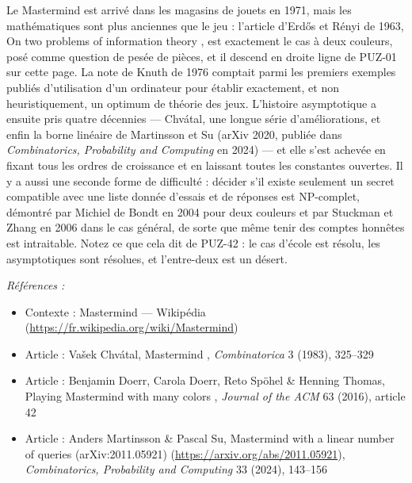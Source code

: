 \documentclass[11pt]{article}
\newenvironment{refs}{\par\small\noindent\emph{Références :}\begin{itemize}\setlength\itemsep{0pt}}{\end{itemize}\normalsize}
\begin{document}
\noindent Le Mastermind est arrivé dans les magasins de jouets en 1971, mais les
mathématiques sont plus anciennes que le jeu : l'article d'Erd\H{o}s et Rényi de 1963, \og{} On two
problems of information theory \fg{}, est exactement le cas à deux couleurs, posé comme question
de pesée de pièces, et il descend en droite ligne de PUZ-01 sur cette page. La note de Knuth
de 1976 comptait parmi les premiers exemples publiés d'utilisation d'un ordinateur pour
établir exactement, et non heuristiquement, un optimum de théorie des jeux. L'histoire
asymptotique a ensuite pris quatre décennies --- Chvátal, une longue série d'améliorations, et
enfin la borne linéaire de Martinsson et Su (arXiv 2020, publiée dans \textit{Combinatorics,
Probability and Computing} en 2024) --- et elle s'est achevée en fixant tous les ordres de
croissance et en laissant toutes les constantes ouvertes. Il y a aussi une seconde forme de
difficulté : décider s'il existe seulement un secret compatible avec une liste donnée
d'essais et de réponses est NP-complet, démontré par Michiel de Bondt en 2004 pour deux
couleurs et par Stuckman et Zhang en 2006 dans le cas général, de sorte que même tenir des
comptes honnêtes est intraitable. Notez ce que cela dit de PUZ-42 : le cas d'école est
résolu, les asymptotiques sont résolues, et l'entre-deux est un désert.

\begin{refs}
\item Contexte : Mastermind --- Wikipédia (\url{https://fr.wikipedia.org/wiki/Mastermind})
\item Article : Va\v{s}ek Chvátal, \og{} Mastermind \fg{}, \textit{Combinatorica} 3 (1983), 325--329
\item Article : Benjamin Doerr, Carola Doerr, Reto Spöhel \& Henning Thomas, \og{} Playing Mastermind with many colors \fg{}, \textit{Journal of the ACM} 63 (2016), article 42
\item Article : Anders Martinsson \& Pascal Su, \og{} Mastermind with a linear number of queries \fg{} (arXiv:2011.05921) (\url{https://arxiv.org/abs/2011.05921}), \textit{Combinatorics, Probability and Computing} 33 (2024), 143--156
\end{refs}

\bigskip
\end{document}
